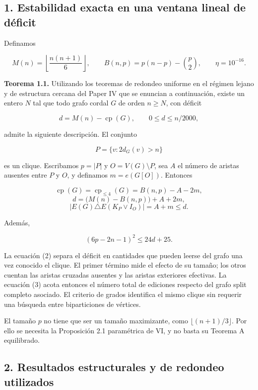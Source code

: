 \documentclass[spanish,11pt,a4paper]{article}
\begin{document}
\subsection{1. Estabilidad exacta en una ventana lineal de
déficit}\label{estabilidad-exacta-en-una-ventana-lineal-de-duxe9ficit}

Definamos

\[
M(n)=\left\lfloor\frac{n(n+1)}6\right\rfloor,
\qquad B(n,p)=p(n-p)-\binom p2,
\qquad \eta=10^{-16}.
\]

\textbf{Teorema 1.1.} Utilizando los teoremas de redondeo uniforme en el
régimen lejano y de estructura cercana del Paper IV que se enuncian a
continuación, existe un entero \(N\) tal que todo grafo cordal \(G\) de
orden \(n\ge N\), con déficit

\[
d=M(n)-\operatorname{cp}(G),\qquad 0\le d\le n/2000,
\]

admite la siguiente descripción. El conjunto

\[
P=\{v:2d_G(v)>n\}
\]

es un clique. Escribamos \(p=|P|\) y \(O=V(G)\setminus P\), sea \(A\) el
número de aristas ausentes entre \(P\) y \(O\), y definamos
\(m=e(G[O])\). Entonces

\[
\boxed{\operatorname{cp}(G)=\operatorname{cp}_{\le4}(G)
=B(n,p)-A-2m,}
\tag{1}
\] \[
\boxed{d=\bigl(M(n)-B(n,p)\bigr)+A+2m,}
\tag{2}
\] \[
\boxed{|E(G)\triangle E(K_P\vee I_O)|=A+m\le d.}
\tag{3}
\]

Además,

\[
(6p-2n-1)^2\le24d+25.
\tag{4}
\]

La ecuación (2) separa el déficit en cantidades que pueden leerse del
grafo una vez conocido el clique. El primer término mide el efecto de su
tamaño; los otros cuentan las aristas cruzadas ausentes y las aristas
exteriores efectivas. La ecuación (3) acota entonces el número total de
ediciones respecto del grafo split completo asociado. El criterio de
grados identifica el mismo clique sin requerir una búsqueda entre
biparticiones de vértices.

El tamaño \(p\) no tiene que ser un tamaño maximizante, como
\(\lfloor(n+1)/3\rfloor\). Por ello se necesita la Proposición 2.1
paramétrica de VI, y no basta su Teorema A equilibrado.

\subsection{2. Resultados estructurales y de redondeo
utilizados}\label{resultados-estructurales-y-de-redondeo-utilizados}
\end{document}

